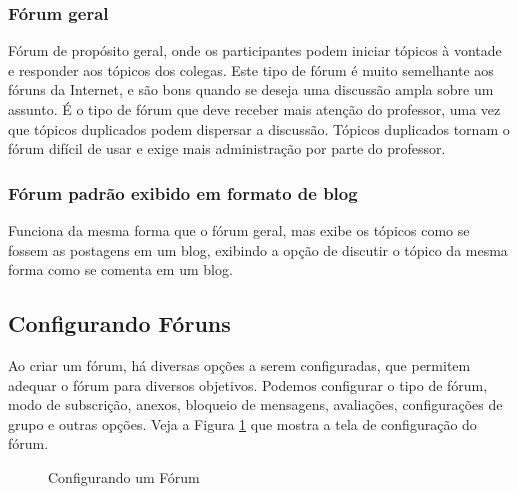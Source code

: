 \subsubsection{Fórum geral}
Fórum de propósito geral, onde os participantes podem iniciar tópicos à vontade e responder aos tópicos dos colegas. Este tipo de fórum é muito semelhante aos fóruns da Internet, e são bons quando se deseja uma discussão ampla sobre um assunto. É o tipo de fórum que deve receber mais atenção do professor, uma vez que tópicos duplicados podem dispersar a discussão. Tópicos duplicados tornam o fórum difícil de usar e exige mais administração por parte do professor.
\subsubsection{Fórum padrão exibido em formato de blog}
Funciona da mesma forma que o fórum geral, mas exibe os tópicos como se fossem as postagens em um blog, exibindo a opção de discutir o tópico da mesma forma como se comenta em um blog.
\subsection{Configurando Fóruns}
Ao criar um fórum, há diversas opções a serem configuradas, que permitem adequar o fórum para diversos objetivos. Podemos configurar o tipo de fórum, modo de subscrição, anexos, bloqueio de mensagens, avaliações, configurações de grupo e outras opções. Veja a Figura \ref{fig:cap5_45} que mostra a tela de configuração do fórum.

 \begin{figure}[htbp]
 \begin{center}
  \caption{Configurando um Fórum}
  \label{fig:cap5_45}
 \end{center}
\end{figure}

